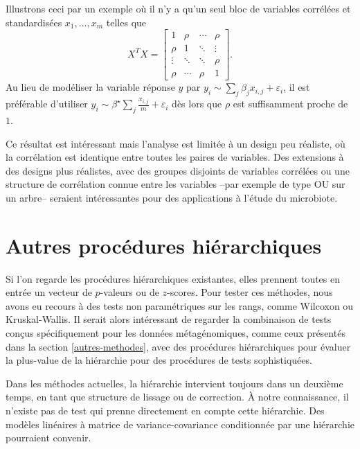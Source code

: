 \documentclass[12pt,a4paper]{reedthesis}
\theoremstyle{definition}
\theoremstyle{definition}
\theoremstyle{definition}
\theoremstyle{remark}
\begin{document}
Illustrons ceci par un exemple où il n'y a qu'un seul bloc de variables corrélées et standardisées \(x_{1}, \ldots, x_{m}\) telles que
\begin{equation*}
X^TX = 
\begin{bmatrix}
1 & \rho & \cdots & \rho \\
\rho & 1 & \ddots & \vdots \\
\vdots & \ddots & \ddots &\rho \\
\rho & \cdots & \rho & 1
\end{bmatrix}.
\end{equation*}
Au lieu de modéliser la variable réponse \(y\) par \(y_i\sim \sum_j \beta_j x_{i,j} + \varepsilon_i\), il est préférable d'utiliser \(y_i\sim \beta^\star \sum_j \frac{x_{i,j}}{m} + \varepsilon_i\) dès lors que \(\rho\) est suffisamment proche de \(1\).

Ce résultat est intéressant mais l'analyse est limitée à un design peu réaliste, où la corrélation est identique entre toutes les paires de variables. Des extensions à des designs plus réalistes, avec des groupes disjoints de variables corrélées ou une structure de corrélation connue entre les variables --par exemple de type OU sur un arbre-- seraient intéressantes pour des applications à l'étude du microbiote.

\hypertarget{autres-procuxe9dures-hiuxe9rarchiques}{%
\section*{Autres procédures hiérarchiques}\label{autres-procuxe9dures-hiuxe9rarchiques}}

Si l'on regarde les procédures hiérarchiques existantes, elles prennent toutes en entrée un vecteur de \(p\)-valeurs ou de \(z\)-scores. Pour tester ces méthodes, nous avons eu recours à des tests non paramétriques sur les rangs, comme Wilcoxon ou Kruskal-Wallis. Il serait alors intéressant de regarder la combinaison de tests conçus spécifiquement pour les données métagénomiques, comme ceux présentés dans la section \ref{autres-methodes}, avec des procédures hiérarchiques pour évaluer la plus-value de la hiérarchie pour des procédures de tests sophistiquées.

Dans les méthodes actuelles, la hiérarchie intervient toujours dans un deuxième temps, en tant que structure de lissage ou de correction. À notre connaissance, il n'existe pas de test qui prenne directement en compte cette hiérarchie. Des modèles linéaires à matrice de variance-covariance conditionnée par une hiérarchie pourraient convenir.
\end{document}
